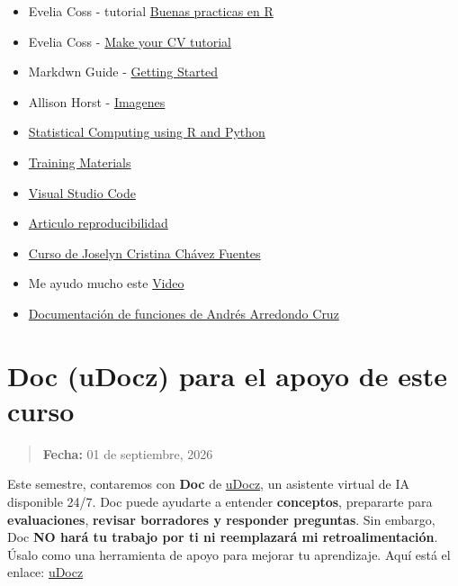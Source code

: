 \documentclass[
  spanish,
  12pt,
  letterpaper,
  DIV=11,
  numbers=noendperiod]{scrreprt}
\begin{document}
\begin{itemize}
{  Practices for Scientific Computing}. PLOS Biology
\item
  Evelia Coss - tutorial
  \href{https://github.com/EveliaCoss/Buenaspracticas_R_Mayo2024}{Buenas
  practicas en R}
\item
  Evelia Coss - \href{https://github.com/EveliaCoss/Make_yourCV}{Make
  your CV tutorial}
\item
  Markdwn Guide -
  \href{https://www.markdownguide.org/getting-started/}{Getting Started}
\item
  Allison Horst -
  \href{https://allisonhorst.com/allison-horst}{Imagenes}
\item
  \href{https://srvanderplas.github.io/stat-computing-r-python/}{Statistical
  Computing using R and Python}
\item
  \href{https://learning.nceas.ucsb.edu/2024-10-coreR/}{Training
  Materials}
\item
  \href{https://damiandeluca.com.ar/como-comenzar-con-visual-studio-code-una-guia-para-principiantes}{Visual
  Studio Code}
\item
  \href{https://blog.ml.cmu.edu/2020/08/31/5-reproducibility/}{Articulo
  reproducibilidad}
\item
  \href{https://comunidadbioinfo.github.io/cdsb2023/creaci\%C3\%B3n-de-vi\%C3\%B1etas.html}{Curso
  de Joselyn Cristina Chávez Fuentes}
\item
  Me ayudo mucho este
  \href{https://www.youtube.com/watch?v=7ZgZ6qUKZvE&ab_channel=DaniMedi}{Video}
\item
  \href{https://comunidadbioinfo.github.io/cdsb2023/documentaci\%C3\%B3n-de-funciones.html}{Documentación
  de funciones de Andrés Arredondo Cruz}
\end{itemize}

\chapter{\texorpdfstring{Doc (uDocz) para el apoyo de este curso
\textbf{🤖}}{Doc (uDocz) para el apoyo de este curso 🤖}}\label{doc-udocz-para-el-apoyo-de-este-curso}

\begin{quote}
\textbf{Fecha:} 01 de septiembre, 2026
\end{quote}

Este semestre, contaremos con \textbf{Doc} de
\href{https://www.udocz.com/}{uDocz}, un asistente virtual de IA
disponible 24/7. Doc puede ayudarte a entender \textbf{conceptos},
prepararte para \textbf{evaluaciones}, \textbf{revisar borradores y
responder preguntas}. Sin embargo, Doc \textbf{NO hará tu trabajo por ti
ni reemplazará mi retroalimentación}. Úsalo como una herramienta de
apoyo para mejorar tu aprendizaje. Aquí está el enlace:
\href{https://www.udocz.com/home}{uDocz}
\end{document}
